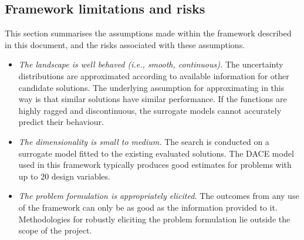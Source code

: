 \documentclass[10pt]{llncs}
\begin{document}
\subsection{Framework limitations and risks}
This section summarises the assumptions made within the framework described in this document, and the risks associated with these assumptions.
\begin{itemize}
	\item \emph{The landscape is well behaved (i.e., smooth, continuous).} The uncertainty distributions are approximated according to available information for other candidate solutions. The underlying assumption for approximating in this way is that similar solutions have similar performance. If the functions are highly ragged and discontinuous, the surrogate models cannot accurately predict their behaviour.
	\item \emph{The dimensionality is small to medium.} The search is conducted on a surrogate model fitted to the existing evaluated solutions. The DACE model used in this framework typically produces good estimates for problems with up to 20 design variables.
	\item \emph{The problem formulation is appropriately elicited.} The outcomes from any use of the framework can only be as good as the information provided to it. Methodologies for robustly eliciting the problem formulation lie outside the scope of the project.
\end{itemize}




\end{document}
